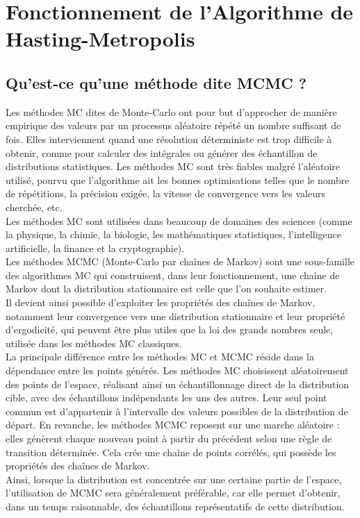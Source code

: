 \documentclass{article}
\begin{document}
\newpage
\section{Fonctionnement de l'Algorithme de Hasting-Metropolis}

\subsection{Qu'est-ce qu'une méthode dite MCMC ?}

Les méthodes MC dites de Monte-Carlo ont pour but d'approcher de manière empirique des valeurs par un processus aléatoire répété un nombre suffisant de fois. Elles interviennent quand une résolution déterministe est trop difficile à obtenir, comme pour calculer des intégrales ou générer des échantillon de distributions statistiques. Les méthodes MC sont très fiables malgré l'aléatoire utilisé, pourvu que l'algorithme ait les bonnes optimisations telles que le nombre de répétitions, la précision exigée, la vitesse de convergence vers les valeurs cherchée, etc. \\
Les méthodes MC sont utilisées dans beaucoup de domaines des sciences (comme la physique, la chimie, la biologie, les mathématiques statistiques, l'intelligence artificielle, la finance et la cryptographie). \\

Les méthodes MCMC (Monte-Carlo par chaînes de Markov) sont une sous-famille des algorithmes MC qui construisent, dans leur fonctionnement, une chaîne de Markov dont la distribution stationnaire est celle que l’on souhaite estimer. \\
Il devient ainsi possible d'exploiter les propriétés des chaînes de Markov, notamment leur convergence vers une distribution stationnaire et leur propriété d'ergodicité, qui peuvent être plus utiles que la loi des grands nombres seule, utilisée dans les méthodes MC classiques. \\
La principale différence entre les méthodes MC et MCMC réside dans la dépendance entre les points générés. Les méthodes MC choisissent aléatoirement des points de l'espace, réalisant ainsi un échantillonnage direct de la distribution cible, avec des échantillons indépendants les uns des autres. Leur seul point commun est d'appartenir à l'intervalle des valeurs possibles de la distribution de départ. En revanche, les méthodes MCMC reposent sur une marche aléatoire : elles génèrent chaque nouveau point à partir du précédent selon une règle de transition déterminée. Cela crée une chaîne de points corrélés, qui possède les propriétés des chaînes de Markov. \\
Ainsi, lorsque la distribution est concentrée sur une certaine partie de l'espace, l’utilisation de MCMC sera généralement préférable, car elle permet d'obtenir, dans un temps raisonnable, des échantillons représentatifs de cette distribution. \\
\end{document}
